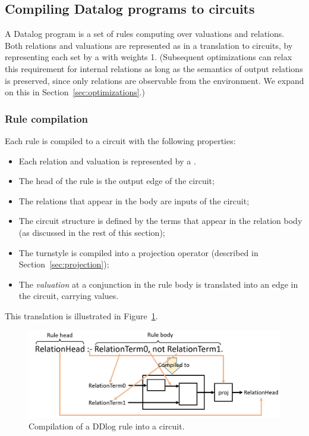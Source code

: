 \subsection{Compiling Datalog programs to circuits}

A Datalog program is a set of rules computing over valuations and relations.
Both relations and valuations are represented as \zrs in a translation to circuits,
by representing each set by a \zr with weights 1.  (Subsequent optimizations can
relax this requirement for internal relations as long as the semantics
of output relations is preserved, since only 
relations are observable from the environment.  We expand on this
in Section~\ref{sec:optimizations}.)  

\subsubsection{Rule compilation}

Each rule is compiled to a circuit with the following properties:

\begin{itemize}
    \item Each relation and valuation is represented by a \zr.
    \item The head of the rule is the output edge of the circuit;
    \item The relations that appear in the body are inputs of the circuit;
    \item The circuit structure is defined by the terms that appear
    in the relation body (as discussed in the rest of this section);
    \item The turnstyle is compiled into a projection operator (described in 
    Section~\ref{sec:projection});
    \item The \emph{valuation} at a conjunction in the rule body
    is translated into an edge in the circuit, carrying \zr values.
\end{itemize}

This translation is illustrated in Figure~\ref{fig:compilation}.

\begin{figure}[h]
    \center
    \includegraphics[width=\columnwidth,clip=true]{compilation.png}
    \caption{Compilation of a DDlog rule into a circuit.\label{fig:compilation}}
\end{figure} 


